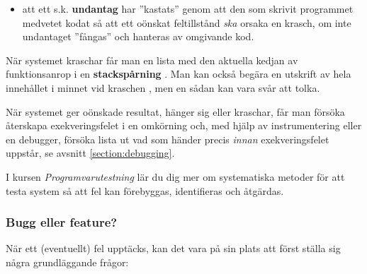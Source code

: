 \begin{itemize}
\begin{itemize}
\begin{itemize}[nolistsep]
\item att ett s.k. \textbf{undantag} har ''kastats''  genom att den som skrivit programmet medvetet kodat så att ett oönskat feltillstånd \emph{ska} orsaka en krasch, om inte undantaget ''fångas''  och hanteras av omgivande kod. 
\end{itemize}

När systemet kraschar får man en lista med den aktuella kedjan av funktionsanrop i en \textbf{stackspårning} . Man kan också begära en utskrift av hela innehållet i minnet vid kraschen , men en sådan kan vara svår att tolka.

\end{itemize}

\end{itemize}

När systemet ger oönskade resultat, hänger sig eller kraschar, får man försöka återskapa exekveringsfelet i en omkörning och, med hjälp av instrumentering eller en debugger, försöka lista ut vad som händer precis \emph{innan} exekveringsfelet uppstår, se  avsnitt \ref{section:debugging}.

I kursen \textit{Programvarutestning}  lär du dig mer om systematiska metoder för att testa system så att fel kan förebyggas, identifieras och åtgärdas.

\subsubsection{Bugg eller feature?} 

När ett (eventuellt) fel upptäcks, kan det vara på sin plats att först ställa sig några grundläggande  frågor:

